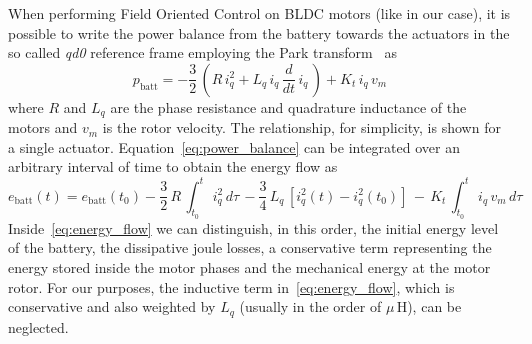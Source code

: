 When performing Field Oriented Control on BLDC motors (like in our case), it is possible to write the power balance from the battery towards the actuators in the so called \textit{qd0} reference frame employing the Park transform~\cite{foc::krause2013analysis} as 
\begin{equation}\label{eq:power_balance}
    p_{\mathrm{batt}} = - \dfrac{3}{2}\,\left(R\,i_{q}^2 + L_q\,i_{q}\,\dfrac{d}{dt}\,i_q\,\right) + K_t\,i_q\,v_m
\end{equation}
where $R$ and $L_q$ are the phase resistance and quadrature inductance of the motors and $v_m$ is the rotor velocity. The relationship, for simplicity, is shown for a single actuator. Equation~\eqref{eq:power_balance} can be integrated over an arbitrary interval of time to obtain the energy flow as 
\begin{dmath} \label{eq:energy_flow}
e_{\mathrm{batt}}(t) = e_{\mathrm{batt}}(t_0)- \dfrac{3}{2}\,R\,\int_{t_0}^{t}\,i_{q}^2\,d\tau\,- \dfrac{3}{4}\,L_q\,\left[i_q^2(t) - i_q^2(t_0)\right]\,-\,K_t\,\int_{t_0}^{t}\,i_q\,v_{m}\,d\tau
\end{dmath}
Inside~\eqref{eq:energy_flow} we can distinguish, in this order, the initial energy level of the battery, the dissipative joule losses, a conservative term representing the energy stored inside the motor phases and the mechanical energy at the motor rotor. For our purposes, the inductive term in~\eqref{eq:energy_flow}, which is conservative and also weighted by $L_q$ (usually in the order of $\mu\,\mathrm{H}$), can be neglected. 

